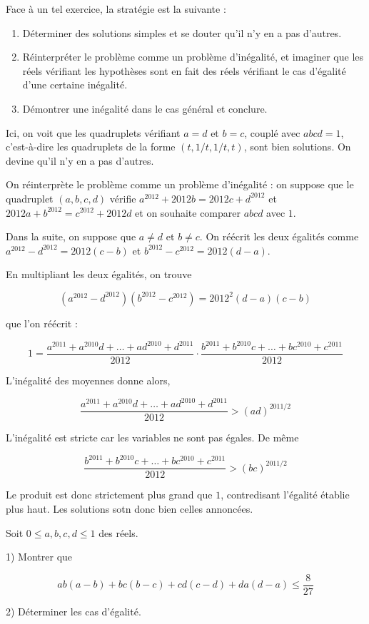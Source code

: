 \begin{sol}
Face à un tel exercice, la stratégie est la suivante :

\begin{enumerate}
\item Déterminer des solutions simples et se douter qu'il n'y en a pas d'autres.
\item Réinterpréter le problème comme un problème d'inégalité, et imaginer que les réels vérifiant les hypothèses sont en fait des réels vérifiant le cas d'égalité d'une certaine inégalité.
\item Démontrer une inégalité dans le cas général et conclure.
\end{enumerate}

Ici, on voit que les quadruplets vérifiant $a=d$ et $b=c$, couplé avec $abcd=1$, c'est-à-dire les quadruplets de la forme $(t, 1/t, 1/t, t)$, sont bien solutions. On devine qu'il n'y en a pas d'autres.

On réinterprète le problème comme un problème d'inégalité : on suppose que le quadruplet $(a,b,c,d)$ vérifie $a^{2012}+2012b=2012c+d^{2012}$ et $2012a+b^{2012}=c^{2012}+2012d$ et on souhaite comparer $abcd$ avec $1$.

\medskip

Dans la suite, on suppose que $a\ne d$ et $b\ne c$. On réécrit les deux égalités comme $a^{2012}-d^{2012}=2012(c-b)$ et $b^{2012}-c^{2012}=2012(d-a)$.

En multipliant les deux égalités, on trouve

$$(a^{2012}-d^{2012})(b^{2012}-c^{2012})= 2012^2 (d-a)(c-b)$$

que l'on réécrit :

$$1= \frac{a^{2011}+a^{2010}d+ \ldots +ad^{2010}+d^{2011}}{2012} \cdot \frac{b^{2011}+b^{2010}c+ \ldots +bc^{2010}+c^{2011}}{2012}$$

L'inégalité des moyennes donne alors,

$$ \frac{a^{2011}+a^{2010}d+ \ldots +ad^{2010}+d^{2011}}{2012} > (ad)^{2011/2}$$

L'inégalité est stricte car les variables ne sont pas égales. De même

$$\frac{b^{2011}+b^{2010}c+ \ldots +bc^{2010}+c^{2011}}{2012}> (bc)^{2011/2}$$

Le produit est donc strictement plus grand que $1$, contredisant l'égalité établie plus haut. Les solutions sotn donc bien celles annoncées.
\end{sol}

\begin{exo}[BXMO 2019]
Soit $0\le a,b,c,d\le 1$ des réels.

1) Montrer que

$$ab(a-b)+bc(b-c)+cd(c-d)+da(d-a) \le \frac{8}{27}$$

2) Déterminer les cas d'égalité.
\end{exo}

